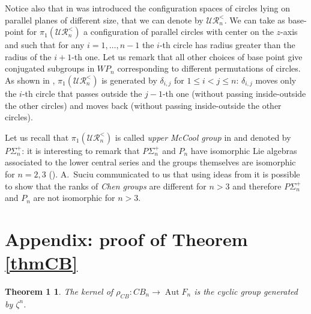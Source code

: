 \documentclass[11pt]{amsart}
\newtheorem*{theorem1}{Theorem 1}
\begin{document}
Notice also that  in \cite{BH} was introduced the configuration spaces of circles lying on parallel planes of different size, that 
 we can denote by $\mathcal{UR}^<_n$.  We can take as base-point for $\pi_1(\mathcal{UR}^<_n)$  a configuration
  of parallel circles with center on the $z$-axis and such that for any $i=1, \ldots, n-1$
 the $i$-th circle has radius greater than the radius of the $i+1$-th one. Let us remark that all other choices of base point  give conjugated subgroups  in  $WP_n$
 corresponding to different  permutations of circles.   As shown in \cite{BH},  $\pi_1(\mathcal{UR}^<_n)$ is generated by $\delta_{i,j}$ for $1{\leqslant} i < j {\leqslant} n$:  $\delta_{i,j}$ moves only the $i$-th circle that 
  passes outside  the $j-1$-th one (without passing inside-outside the other circles) and moves back (without passing inside-outside the other circles). 
  
 Let us recall that $\pi_1(\mathcal{UR}^<_n)$ is  called {\emph{{upper McCool group}}}
 in \cite{CPVW} and denoted by $P\Sigma_n^+$:   it is interesting to remark  that $P\Sigma_n^+$ and $P_n$ have isomorphic Lie algebras associated to the lower central series
  and the groups themselves are isomorphic for $n=2,3$ (\cite{CPVW}). A.~Suciu communicated to  us that using ideas from \cite{CoS}  it is possible to show that
  the ranks  of \emph{Chen groups} are different for $n>3$ and therefore $P\Sigma_n^+$ and $P_n$ are not isomorphic for 
 $n>3$.

\section*{Appendix: proof of Theorem \ref{thmCB}}
\begin{theorem1} 
The kernel of $\rho_{CB}:  CB_n \to {\mathop{\mathrm{Aut}}\nolimits} F_n$ is the cyclic group generated by $\zeta^n$.
\end{theorem1}
\end{document}

